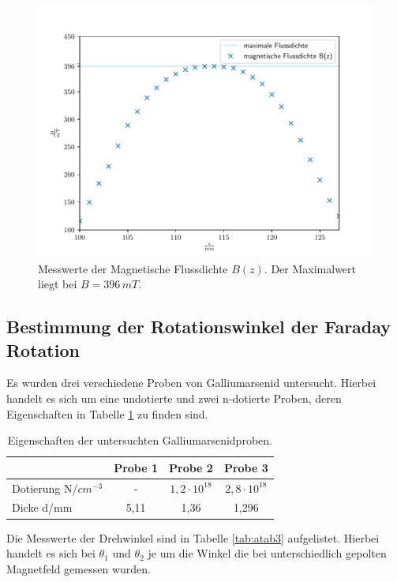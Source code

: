 \FloatBarrier
\begin{figure}[h]
    \centering
    \includegraphics[width=\textwidth]{magnetfeld.pdf}
    \caption{Messwerte der Magnetische Flussdichte $B(z)$. Der Maximalwert liegt bei $B = 396\,\si{mT}$.}
    \label{fig:afig1}
\end{figure}
\FloatBarrier
\noindent


\subsection{Bestimmung der Rotationswinkel der Faraday Rotation}
Es wurden drei verschiedene Proben von Galliumarsenid untersucht. Hierbei handelt es sich um eine undotierte und zwei n-dotierte Proben, deren Eigenschaften in Tabelle \ref{tab:atab2} zu finden sind.

\FloatBarrier
\begin{table}[h]
    \centering
    \caption{Eigenschaften der untersuchten Galliumarsenidproben.}
    \label{tab:atab2}
    \begin{tabular}{l c c c}
        \toprule
        {} & {Probe 1} & {Probe 2} & {Probe 3} \\
        \midrule
        Dotierung N/$cm^{-3}$ & - & $1,2 \cdot 10^{18}$ & $2,8 \cdot 10^{18}$ \\
        Dicke d/mm & 5,11 & 1,36 & 1,296 \\
        \bottomrule
    \end{tabular}
\end{table}
\FloatBarrier
\noindent


Die Messwerte der Drehwinkel sind in Tabelle \ref{tab:atab3} aufgelistet. Hierbei handelt es sich bei $\theta_1$ und $\theta_2$ je um die Winkel die bei unterschiedlich gepolten Magnetfeld gemessen wurden.


